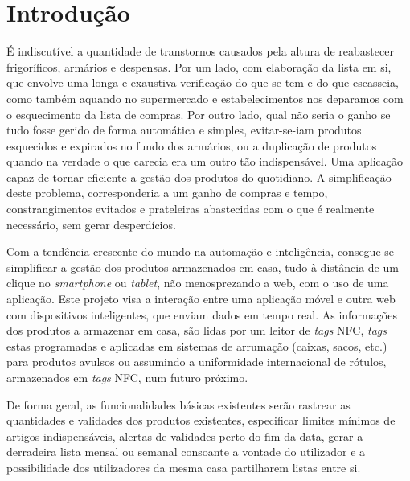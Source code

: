 %
%
\chapter*{Introdução} \label{cap1}

É indiscutível a quantidade de transtornos causados pela altura de reabastecer frigoríficos, armários e despensas. Por um lado, com elaboração da lista em si, que envolve uma longa e exaustiva verificação do que se tem e do que escasseia, como também aquando no supermercado e estabelecimentos nos deparamos com o esquecimento da lista de compras. Por outro lado, qual não seria o ganho se tudo fosse gerido de forma automática e simples, evitar-se-iam produtos esquecidos e expirados no fundo dos armários, ou a duplicação de produtos quando na verdade o que carecia era um outro tão indispensável. Uma aplicação capaz de tornar eficiente a gestão dos produtos do quotidiano. A simplificação deste problema, corresponderia a um ganho de compras e tempo, constrangimentos evitados e prateleiras abastecidas com o que é realmente necessário, sem gerar desperdícios.

Com a tendência crescente do mundo na automação e inteligência, consegue-se simplificar a gestão dos produtos armazenados em casa, tudo à distância de um clique no {\itshape smartphone} ou {\itshape tablet}, não menosprezando a web, com o uso de uma aplicação. Este projeto visa a interação entre uma aplicação móvel e outra web com dispositivos inteligentes, que enviam dados em tempo real. As informações dos produtos a armazenar em casa, são lidas por um leitor de {\itshape tags} NFC, {\itshape tags} estas programadas e aplicadas em sistemas de arrumação (caixas, sacos, etc.) para produtos avulsos ou assumindo a uniformidade internacional de rótulos, armazenados em {\itshape tags} NFC, num futuro próximo.

De forma geral, as funcionalidades básicas existentes serão rastrear as quantidades e validades dos produtos existentes, especificar limites mínimos de artigos indispensáveis, alertas de validades perto do fim da data, gerar a derradeira lista mensal ou semanal consoante a vontade do utilizador e a possibilidade dos utilizadores da mesma casa partilharem listas entre si.